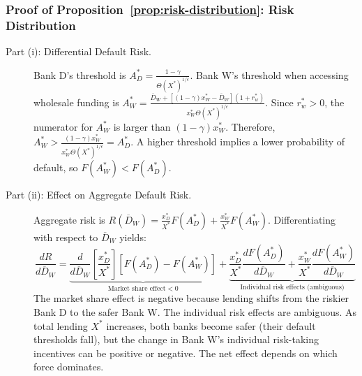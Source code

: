 \documentclass[12pt]{article}
\begin{document}
\subsubsection{Proof of Proposition~\ref{prop:risk-distribution}: Risk Distribution}
\label{app:proof-prop7-6}
\begin{description}
    \item[Part (i): Differential Default Risk.] Bank D's threshold is $A_{D}^{*} = \frac{1-\gamma}{\Theta(X^{*})^{1/\epsilon}}$. Bank W's threshold when accessing wholesale funding is $A_{W}^{*} = \frac{\overline{D}_{W}+[(1-\gamma)x_{W}^{*}-\overline{D}_{W}](1+r_{w}^{*})}{x_{W}^{*}\Theta(X^{*})^{1/\epsilon}}$. Since $r_{w}^{*} > 0$, the numerator for $A_W^*$ is larger than $(1-\gamma)x_W^*$. Therefore, $A_{W}^{*} > \frac{(1-\gamma)x_{W}^{*}}{x_{W}^{*}\Theta(X^{*})^{1/\epsilon}} = A_{D}^{*}$. A higher threshold implies a lower probability of default, so $F(A_{W}^{*}) < F(A_{D}^{*})$.
    \item[Part (ii): Effect on Aggregate Default Risk.] Aggregate risk is $R(\overline{D}_{W}) = \frac{x_{D}^{*}}{X^{*}}F(A_{D}^{*}) + \frac{x_{W}^{*}}{X^{*}}F(A_{W}^{*})$. Differentiating with respect to $\overline{D}_{W}$ yields:
    \begin{equation*}
    \frac{dR}{d\overline{D}_{W}} = \underbrace{\frac{d}{d\overline{D}_{W}}\left[\frac{x_{D}^{*}}{X^{*}}\right][F(A_{D}^{*}) - F(A_{W}^{*})]}_{\text{Market share effect} < 0} + \underbrace{\frac{x_{D}^{*}}{X^{*}}\frac{dF(A_{D}^{*})}{d\overline{D}_{W}} + \frac{x_{W}^{*}}{X^{*}}\frac{dF(A_{W}^{*})}{d\overline{D}_{W}}}_{\text{Individual risk effects (ambiguous)}}
    \end{equation*}
    The market share effect is negative because lending shifts from the riskier Bank D to the safer Bank W. The individual risk effects are ambiguous. As total lending $X^*$ increases, both banks become safer (their default thresholds fall), but the change in Bank W's individual risk-taking incentives can be positive or negative. The net effect depends on which force dominates.
\end{description}
\end{document}
